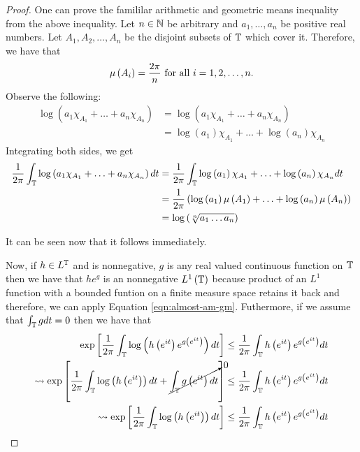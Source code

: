 \begin{proof}
    One can prove the famililar arithmetic and geometric means inequality from the above inequality. Let $n\in \mathbb N$ be arbitrary and $a_{1}, \ldots, a_{n}$ be positive real numbers. Let $A_{1}, A_{2}, \ldots , A_{n}$ be the disjoint subsets of $\mathbb T$ which cover it. Therefore, we have that
    \begin{align*}
	\mu \left( A_{i} \right) = \frac{2\pi}{n} \text{ for all } i=1,2,\ldots,n\text.
    \end{align*}
    Observe the following:
    \begin{align*}
	\log\left( a_{1} \chi_{A_{1}} + \ldots + a_{n} \chi_{A_{n}} \right) &= \log \left( a_{1} \chi_{A_{1}} + \ldots + a_{n} \chi_{A_{n}} \right) \\
	&= \log \left( a_{1} \right) \chi_{A_{1}} + \ldots + \log \left( a_{n} \right) \chi_{A_{n}}
    \end{align*}
    Integrating both sides, we get
    \begin{align*}
	\frac{1}{2\pi} \int_{\mathbb T} \log\left( a_{1} \chi_{A_{1}} + \ldots + a_{n} \chi_{A_{n}} \right) dt &= \frac{1}{2\pi} \int_{\mathbb T}  \log \left( a_{1} \right) \chi_{A_{1}} + \ldots + \log \left( a_{n} \right) \chi_{A_{n}} dt \\
	&= \frac{1}{2\pi} \left( \log \left( a_{1} \right) \mu \left( A_{1} \right) + \ldots +  \log \left( a_{n} \right) \mu \left( A_{n} \right) \right) \\
	&=  \log \left( \sqrt[n]{a_{1}\ldots a_{n}} \right)
    \end{align*}
     
    It can be seen now that it follows immediately.

    Now, if $h\in L^{\mathbb T}$ and is nonnegative, $g$ is any real valued continuous function on $\mathbb T$ then we have that $he^{g}$ is an nonnegative $L^{1} \left( \mathbb T \right)$ because product of an $L^{1}$ function with a bounded funtion on a finite measure space retains it back and therefore, we can apply Equation \ref{eqn:almost-am-gm}. Futhermore, if we assume that $\int_{\mathbb T} g dt =0 $ then we have that 
    \begin{align*}
	\exp\left[ \frac{1}{2\pi} \int_{\mathbb T} \log \left( h\left( e^{it} \right) e^{g\left( e^{it} \right)}\right) dt \right] \le \frac{1}{2\pi} \int_{\mathbb T} h\left( e^{it} \right) e^{g\left( e^{it} \right)} dt \\
	\leadsto \exp\left[ \frac{1}{2\pi} \int_{\mathbb T} \log \left( h\left( e^{it} \right) \right) dt + \cancelto{0}{\int_{\mathbb T} g\left( e^{it} \right) dt} \right] \le \frac{1}{2\pi} \int_{\mathbb T} h\left( e^{it} \right) e^{g\left( e^{it} \right)} dt \\
\leadsto \exp\left[ \frac{1}{2\pi} \int_{\mathbb T} \log \left( h\left( e^{it} \right) \right) dt  \right] \le \frac{1}{2\pi} \int_{\mathbb T} h\left( e^{it} \right) e^{g\left( e^{it} \right)} dt \\
    \end{align*}


\end{proof}
